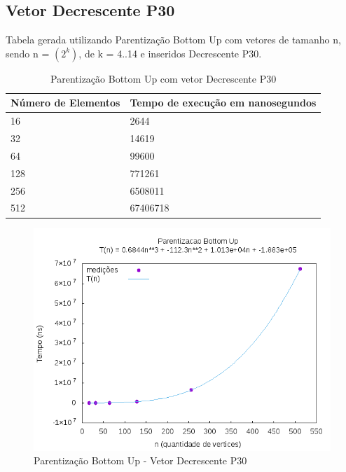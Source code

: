 \documentclass[12pt,a4paper,twoside]{report}
\begin{document}
\subsection{Vetor Decrescente P30}
Tabela gerada utilizando Parentização Bottom Up com vetores de tamanho n, sendo n = $(2^k)$, de k = 4..14 e inseridos Decrescente P30.
\begin{table}[H]
\centering
\caption{Parentização Bottom Up com vetor Decrescente P30}
\label{my-label}
\begin{tabular}{|l|l|}
\hline
\multicolumn{1}{|c|}{\textbf{Número de Elementos}} & \multicolumn{1}{c|}{\textbf{Tempo de execução em nanosegundos}} \\ \hline
16 & 2644 \\ \hline
32 & 14619 \\ \hline
64 & 99600 \\ \hline
128 & 771261 \\ \hline
256 & 6508011 \\ \hline
512 & 67406718 \\ \hline
\end{tabular}
\end{table}

\begin{figure}[H]
    \centering
    \includegraphics[width=0.7\linewidth]{graficos/Parentizacao BottomUp/Decrescente P30/ParentizacaoBottomUp.png}
  \caption{Parentização Bottom Up - Vetor Decrescente P30}
\end{figure}
\end{document}
